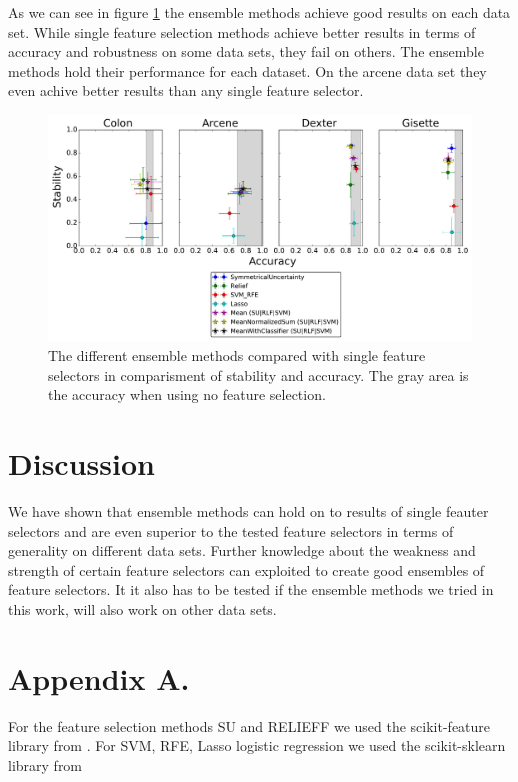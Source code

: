 \documentclass[twoside,11pt]{article}
\begin{document}
As we can see in figure \ref{fig:boxplot} the ensemble methods achieve good results on each data set. While single feature selection methods achieve better results in terms of accuracy and robustness on some data sets, they fail on others. The ensemble methods hold their performance for each dataset. On the arcene data set they even achive better results than any single feature selector.

\begin{figure}[H]
  \centering
    \includegraphics[width=\textwidth]{images/boxplot.pdf}
  \caption{The different ensemble methods compared with single feature selectors in comparisment of stability and accuracy.
  The gray area is the accuracy when using no feature selection.}
  \label{fig:boxplot}
\end{figure}

\section{Discussion}
We have shown that ensemble methods can hold on to results of single feauter selectors and are even superior to the tested feature selectors in terms of generality on different data sets. Further knowledge about the weakness and strength of certain feature selectors can exploited to create good ensembles of feature selectors. It it also has to be tested if the ensemble methods we tried in this work, will also work on other data sets.

\vskip 0.2in


\newpage

\appendix
\section*{Appendix A.}
For the feature selection methods SU and RELIEFF we used the scikit-feature library from \cite{Li-etal16}.
For SVM, RFE, Lasso logistic regression we used the scikit-sklearn library from \cite{scikit-learn}
\label{app:appendixa}
\end{document}
